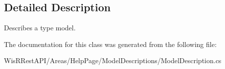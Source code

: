 \subsection{Detailed Description}
Describes a type model. 



The documentation for this class was generated from the following file\+:\begin{DoxyCompactItemize}
\item 
Wis\+R\+Rest\+A\+P\+I/\+Areas/\+Help\+Page/\+Model\+Descriptions/Model\+Description.\+cs\end{DoxyCompactItemize}
